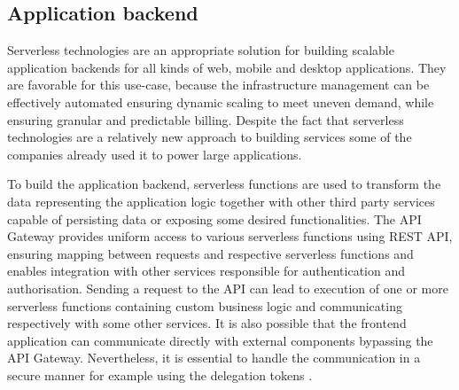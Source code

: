 
\subsection*{Application backend}


Serverless technologies are an appropriate solution for building scalable application backends for all kinds of web, mobile and desktop applications. They are favorable for this use-case, because the infrastructure management can be effectively automated ensuring dynamic scaling to meet uneven demand, while ensuring granular and predictable billing. Despite the fact that serverless technologies are a relatively new approach to building services some of the companies already used it to power large applications.

To build the application backend, serverless functions are used to transform the data representing the application logic together with other third party services capable of persisting data or exposing some desired functionalities. The API Gateway provides uniform access to various serverless functions using REST API, ensuring mapping between requests and respective serverless functions and enables integration with other services responsible for authentication and authorisation. Sending a request to the API can lead to execution of one or more serverless functions containing custom business logic and communicating respectively with some other services. It is also possible that the frontend application can communicate directly with external components bypassing the API Gateway. Nevertheless, it is essential to handle the communication in a secure manner for example using the delegation tokens \cite{ServerlessArchitectureOnAWS}.

